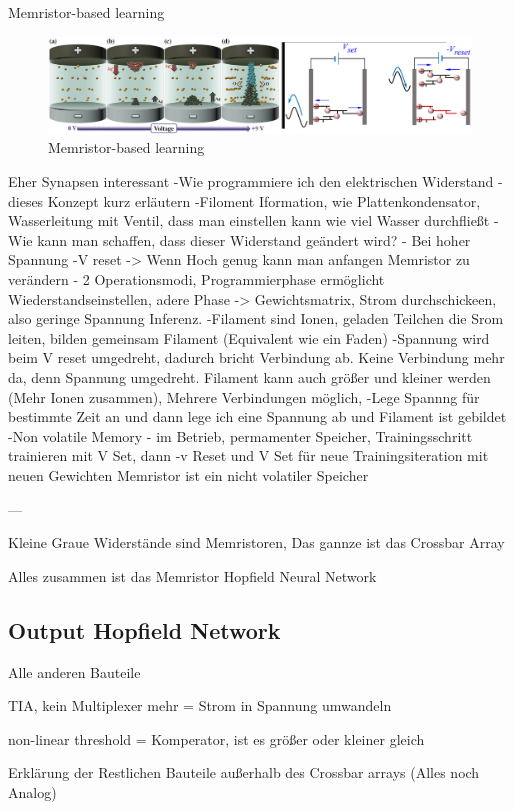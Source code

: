Memristor-based learning
\begin{figure}[H]
    \centering
    \includegraphics[width=0.8\linewidth]{graphics/Memristor_filoments.png}
    \caption{Memristor-based learning}
\end{figure}


Eher Synapsen interessant
-Wie programmiere ich den elektrischen Widerstand - dieses Konzept kurz erläutern
-Filoment Iformation, wie Plattenkondensator, Wasserleitung mit Ventil, dass man einstellen kann wie viel Wasser durchfließt
- Wie kann man schaffen, dass dieser Widerstand geändert wird?
- Bei hoher Spannung -V reset -> Wenn Hoch genug kann man anfangen Memristor zu verändern 
- 2 Operationsmodi, Programmierphase ermöglicht Wiederstandseinstellen, adere Phase -> Gewichtsmatrix, Strom durchschickeen, also 
geringe Spannung Inferenz. 
-Filament sind Ionen, geladen Teilchen die Srom leiten, bilden gemeinsam Filament (Equivalent wie ein Faden) 
-Spannung wird beim V reset umgedreht, dadurch bricht Verbindung ab. Keine Verbindung mehr da, denn Spannung umgedreht. 
Filament kann auch größer und kleiner werden (Mehr Ionen zusammen), Mehrere Verbindungen möglich,
-Lege Spannng für bestimmte Zeit an und dann lege ich eine Spannung ab und Filament ist gebildet
-Non volatile Memory - im Betrieb, permamenter Speicher, Trainingsschritt trainieren mit V Set, dann -v Reset und V Set für neue Trainingsiteration mit neuen Gewichten
Memristor ist ein nicht volatiler Speicher

---

Kleine Graue Widerstände sind Memristoren,
Das gannze ist das Crossbar Array

Alles zusammen ist das Memristor Hopfield Neural Network


\subsection{Output Hopfield Network}
Alle anderen Bauteile 

TIA, kein Multiplexer mehr = Strom in Spannung umwandeln 

non-linear threshold = Komperator, ist es größer oder kleiner gleich 

Erklärung der Restlichen Bauteile außerhalb des Crossbar arrays (Alles noch Analog)

